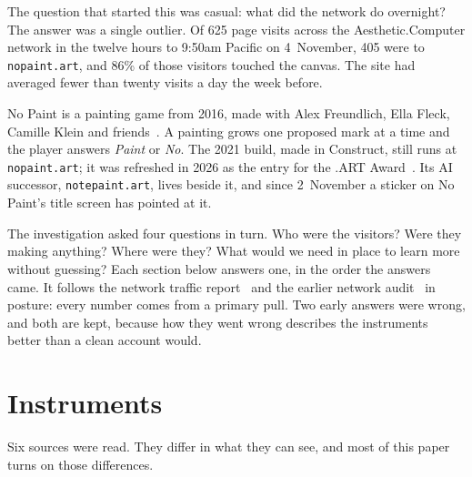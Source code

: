 \documentclass[10pt,letterpaper,twocolumn]{article}
\newcommand{\acdot}{{\color{acpink}.}}
\newcommand{\ac}{Aesthetic{\acdot}Computer}
\begin{document}
The question that started this was casual: what did the network do
overnight? The answer was a single outlier. Of 625 page visits across
the \ac{} network in the twelve hours to 9:50am Pacific on
4~November, 405 were to \texttt{nopaint.art}, and 86\% of those
visitors touched the canvas. The site had averaged fewer than
twenty visits a day the week before.

No Paint is a painting game from 2016, made with Alex Freundlich, Ella
Fleck, Camille Klein and friends~\citep{scudder2016nopaint}. A painting
grows one proposed mark at a time and the player answers \emph{Paint} or
\emph{No}. The 2021 build, made in Construct, still runs at
\texttt{nopaint.art}; it was refreshed in 2026 as the entry for the
.ART Award~\citep{dotart2026award}. Its AI successor,
\texttt{notepaint.art}, lives beside it, and since 2~November a
sticker on No Paint's title screen has pointed at it.

The investigation asked four questions in turn. Who were the visitors?
Were they making anything? Where were they? What would we need in place
to learn more without guessing? Each section below answers one, in the
order the answers came. It follows the network traffic report~\citep{scudder2026traffic} and
the earlier network audit~\citep{scudder2026audit} in posture: every
number comes from a primary pull. Two early answers were wrong, and both are kept,
because how they went wrong describes the instruments better than a
clean account would.

\section{Instruments}
\label{sec:instruments}

Six sources were read. They differ in what they can see, and most of
this paper turns on those differences.
\end{document}
